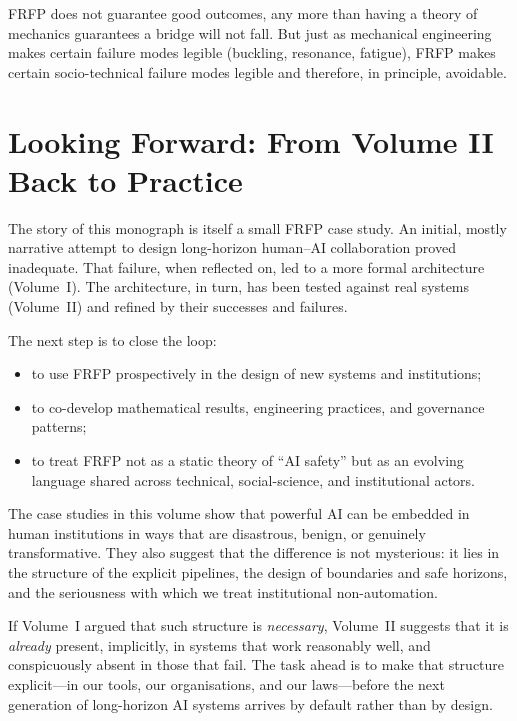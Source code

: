 FRFP does not guarantee good outcomes, any more than having a theory of mechanics guarantees a bridge will not fall.
But just as mechanical engineering makes certain failure modes legible (buckling, resonance, fatigue), FRFP makes certain socio-technical failure modes legible and therefore, in principle, avoidable.

\section*{Looking Forward: From Volume II Back to Practice}

The story of this monograph is itself a small FRFP case study.
An initial, mostly narrative attempt to design long-horizon human--AI collaboration proved inadequate.
That failure, when reflected on, led to a more formal architecture (Volume~I).
The architecture, in turn, has been tested against real systems (Volume~II) and refined by their successes and failures.

The next step is to close the loop:

\begin{itemize}
  \item to use FRFP prospectively in the design of new systems and institutions;
  \item to co-develop mathematical results, engineering practices, and governance patterns;
  \item to treat FRFP not as a static theory of ``AI safety'' but as an evolving language shared across technical, social-science, and institutional actors.
\end{itemize}

The case studies in this volume show that powerful AI can be embedded in human institutions in ways that are disastrous, benign, or genuinely transformative.
They also suggest that the difference is not mysterious:
it lies in the structure of the explicit pipelines, the design of boundaries and safe horizons, and the seriousness with which we treat institutional non-automation.

If Volume~I argued that such structure is \emph{necessary}, Volume~II suggests that it is \emph{already} present, implicitly, in systems that work reasonably well, and conspicuously absent in those that fail.
The task ahead is to make that structure explicit---in our tools, our organisations, and our laws---before the next generation of long-horizon AI systems arrives by default rather than by design.
